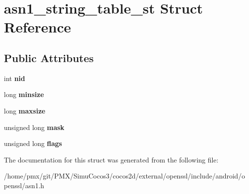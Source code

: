 \hypertarget{structasn1__string__table__st}{}\section{asn1\+\_\+string\+\_\+table\+\_\+st Struct Reference}
\label{structasn1__string__table__st}
\subsection*{Public Attributes}
\begin{DoxyCompactItemize}
\item 
\mbox{\label{structasn1__string__table__st_afc0e790d52b34b5f3705214ee92fa207}} 
int {\bfseries nid}
\item 
\mbox{\label{structasn1__string__table__st_a4428b94f772280133e146a55e2731610}} 
long {\bfseries minsize}
\item 
\mbox{\label{structasn1__string__table__st_a8a4de03a35f1840e86f9aa8ba934a42f}} 
long {\bfseries maxsize}
\item 
\mbox{\label{structasn1__string__table__st_a3dcff470ab384f991b68bbd9f2034d55}} 
unsigned long {\bfseries mask}
\item 
\mbox{\label{structasn1__string__table__st_a37e4651359671ca1bd5b3f8013ca5ef4}} 
unsigned long {\bfseries flags}
\end{DoxyCompactItemize}


The documentation for this struct was generated from the following file\+:\begin{DoxyCompactItemize}
\item 
/home/pmx/git/\+P\+M\+X/\+Simu\+Cocos3/cocos2d/external/openssl/include/android/openssl/asn1.\+h\end{DoxyCompactItemize}

